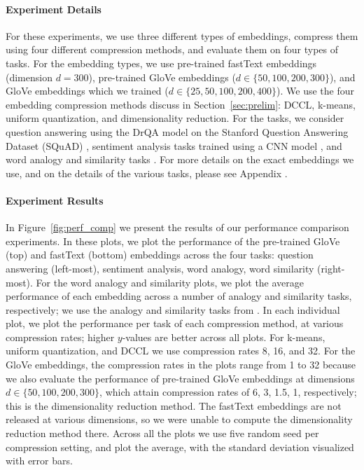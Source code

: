 \paragraph{Experiment Details}
For these experiments, we use three different types of embeddings,
compress them using four different compression methods,
and evaluate them on four types of tasks.
For the embedding types, we use pre-trained fastText embeddings (dimension $d=300$), pre-trained GloVe embeddings ($d \in \{50,100,200,300\}$), and GloVe embeddings which we trained ($d \in \{25,50,100,200,400\}$).
We use the four embedding compression methods discuss in Section~\ref{sec:prelim}: DCCL, k-means, uniform quantization, and dimensionality reduction.
For the tasks, we consider question answering using the DrQA model \citep{drqa17} on the Stanford Question Answering Dataset (SQuAD) \citep{squad16}, sentiment analysis tasks trained using a CNN model \citep{kim14}, and word analogy and similarity tasks \citep{levy15}.
For more details on the exact embeddings we use, and on the details of the various tasks, please see Appendix .

\paragraph{Experiment Results}
In Figure~\ref{fig:perf_comp} we present the results of our performance comparison experiments.
In these plots, we plot the performance of the pre-trained GloVe (top) and fastText (bottom) embeddings across the four tasks: question answering (left-most), sentiment analysis, word analogy, word similarity (right-most).
For the word analogy and similarity plots, we plot the average performance of each embedding across a number of analogy and similarity tasks, respectively;
we use the analogy and similarity tasks from \citet{levy15}.
In each individual plot, we plot the performance per task of each compression method, at various compression rates;
higher $y$-values are better across all plots.
For k-means, uniform quantization, and DCCL we use compression rates 8, 16, and 32.
For the GloVe embeddings, the compression rates in the plots range from 1 to 32 because we also evaluate the performance of pre-trained GloVe embeddings at dimensions $d\in\{50,100,200,300\}$, which attain compression rates of 6, 3, 1.5, 1, respectively;
this is the dimensionality reduction method.
The fastText embeddings are not released at various dimensions, so we were unable to compute the dimensionality reduction method there.
Across all the plots we use five random seed per compression setting, and plot the average, with the standard deviation visualized with error bars.

